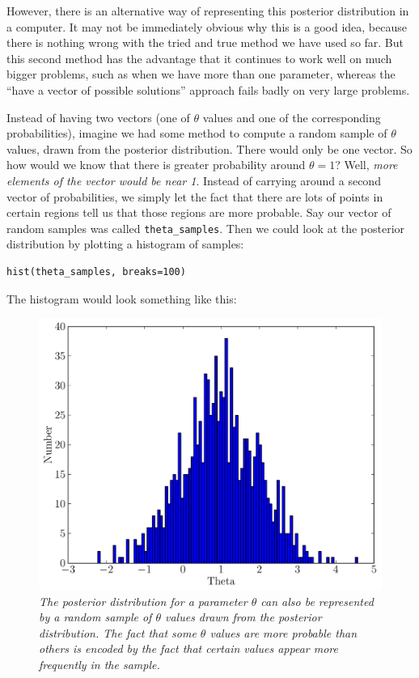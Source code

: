 However,
there is an alternative way of representing this posterior distribution in a
computer. It may not be immediately obvious why this is a good idea,
because there is nothing wrong with the tried and true method we have used
so far. But this second method has the advantage that it continues to
work well on much bigger problems, such as when we have more than one parameter,
whereas the ``have a vector of possible solutions'' approach fails badly on
very large problems.

Instead of having two vectors (one of $\theta$ values and one of the
corresponding probabilities),
imagine we had some method to compute a random sample of $\theta$ values, drawn
from the posterior distribution. There would only be one vector. So how would we
know that there is greater probability around $\theta=1$? Well, {\it more elements
of the vector would be near 1}. Instead of carrying around a second vector of
probabilities, we simply let the fact that there are lots of points in certain
regions tell us that those regions are more probable. Say our vector of random
samples was called {\tt theta\_samples}. Then we could look at the posterior distribution
by plotting a histogram of samples:
\begin{verbatim}
hist(theta_samples, breaks=100)
\end{verbatim}
The histogram would look something like this:
\begin{figure}[ht!]
\begin{center}
\includegraphics[scale=0.5]{Figures/normal2.pdf}
\caption{\it The posterior distribution for a parameter $\theta$ can also be
represented by a random sample of $\theta$ values drawn from the posterior
distribution. The fact that some $\theta$ values are more probable than others
is encoded by the fact that certain values appear more frequently in the sample.
\label{fig:normal2}}
\end{center}
\end{figure}
